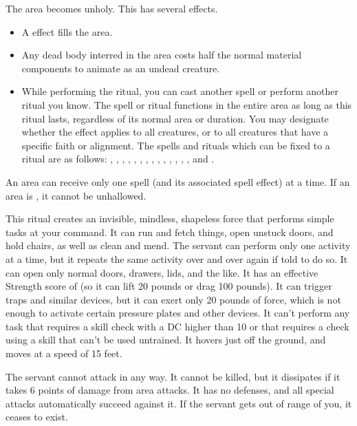 \spellline
\spelleffect The area becomes unholy. This has several effects.
\begin{itemize}
    \item A  effect fills the area.
    \item Any dead body interred in the area costs half the normal material components to animate as an undead creature.
    \item While performing the ritual, you can cast another spell or perform another ritual you know. The spell or ritual functions in the entire area as long as this ritual lasts, regardless of its normal area or duration. You may designate whether the effect applies to all creatures, or to all creatures that have a specific faith or alignment. The spells and rituals which can be fixed to a  ritual are as follows: , , , , , , , , , , , , , , and .
\end{itemize}
\spellnotes An area can receive only one  spell (and its associated spell effect) at a time. If an area is , it cannot be unhallowed.

\spellrng{\rngmed}
\spelldur{\durlong \dismissable}
\spelleffect This ritual creates an invisible, mindless, shapeless force that performs simple tasks at your command. It can run and fetch things, open unstuck doors, and hold chairs, as well as clean and mend. The servant can perform only one activity at a time, but it repeats the same activity over and over again if told to do so. It can open only normal doors, drawers, lids, and the like. It has an effective Strength score of  (so it can lift 20 pounds or drag 100 pounds). It can trigger traps and similar devices, but it can exert only 20 pounds of force, which is not enough to activate certain pressure plates and other devices. It can't perform any task that requires a skill check with a DC higher than 10 or that requires a check using a skill that can't be used untrained. It hovers just off the ground, and moves at a speed of 15 feet.
\par The servant cannot attack in any way. It cannot be killed, but it dissipates if it takes 6 points of damage from area attacks. It has no defenses, and all special attacks automatically succeed against it. If the servant gets out of range of you, it ceases to exist.

